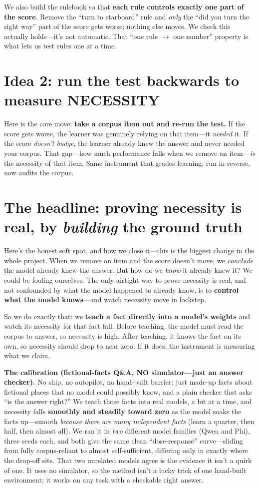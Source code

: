 \documentclass[11pt]{article}
\begin{document}
We also build the rulebook so that \textbf{each rule controls exactly one part of the score}.
Remove the ``turn to starboard'' rule and \emph{only} the ``did you turn the right way'' part of
the score gets worse; nothing else moves. We check this actually holds---it's not automatic. That
``one rule $\to$ one number'' property is what lets us test rules one at a time.

\section*{Idea 2: run the test backwards to measure NECESSITY}

Here is the core move: \textbf{take a corpus item out and re-run the test.} If the score gets
worse, the learner was genuinely relying on that item---it \emph{needed} it. If the score
\emph{doesn't budge}, the learner already knew the answer and never needed your corpus. That
gap---how much performance falls when we remove an item---\emph{is} the necessity of that item.
Same instrument that grades learning, run in reverse, now audits the corpus.

\section*{The headline: proving necessity is real, by \emph{building} the ground truth}

Here's the honest soft spot, and how we close it---this is the biggest change in the whole
project. When we remove an item and the score doesn't move, we \emph{conclude} the model already
knew the answer. But how do we \emph{know} it already knew it? We could be fooling ourselves. The
only airtight way to prove necessity is real, and not confounded by what the model happened to
already know, is to \textbf{control what the model knows}---and watch necessity move in lockstep.

So we do exactly that: we \textbf{teach a fact directly into a model's weights} and watch its
necessity for that fact fall. Before teaching, the model must read the corpus to answer, so
necessity is high. After teaching, it knows the fact on its own, so necessity should drop to
near zero. If it does, the instrument is measuring what we claim.

\textbf{The calibration (fictional-facts Q\&A, NO simulator---just an answer checker).} No ship,
no autopilot, no hand-built barrier: just made-up facts about fictional places that no model could
possibly know, and a plain checker that asks ``is the answer right?'' We teach those facts into
real models, a bit at a time, and necessity falls \textbf{smoothly and steadily toward zero} as the
model soaks the facts up---smooth \emph{because there are many independent facts} (learn a quarter,
then half, then almost all). We ran it in \emph{two} different model families (Qwen and Phi), three
seeds each, and both give the same clean ``dose-response'' curve---sliding from fully corpus-reliant
to almost self-sufficient, differing only in exactly where the drop-off sits. That two unrelated
models agree is the evidence it isn't a quirk of one. It uses no simulator, so the method isn't a
lucky trick of one hand-built environment; it works on any task with a checkable right answer.
\end{document}
